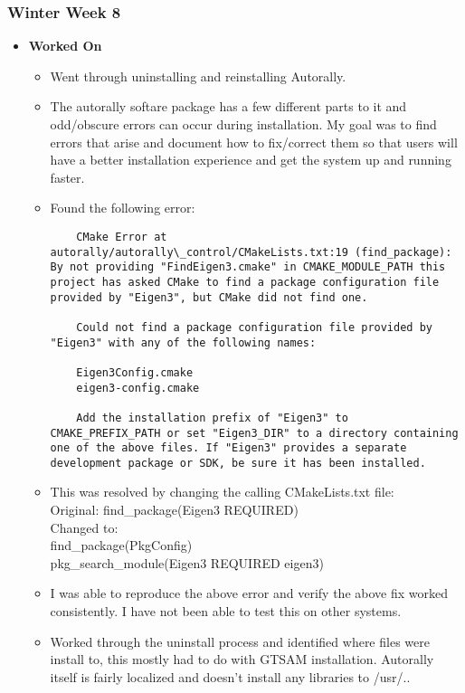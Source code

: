 \documentclass{article}
\begin{document}
\subsubsection{Winter Week 8}
\begin{itemize}
    \item {\textbf{Worked On}}
    \begin{itemize}
        \item Went through uninstalling and reinstalling Autorally.
        \item The autorally softare package has a few different parts to it and odd/obscure errors can occur during installation. My goal was to find errors that arise and document how to fix/correct them so that users will have a better installation experience and get the system up and running faster.

        \item Found the following error:
\begin{verbatim}
    CMake Error at autorally/autorally\_control/CMakeLists.txt:19 (find_package): By not providing "FindEigen3.cmake" in CMAKE_MODULE_PATH this project has asked CMake to find a package configuration file provided by "Eigen3", but CMake did not find one.

    Could not find a package configuration file provided by "Eigen3" with any of the following names:

    Eigen3Config.cmake
    eigen3-config.cmake

    Add the installation prefix of "Eigen3" to CMAKE_PREFIX_PATH or set "Eigen3_DIR" to a directory containing one of the above files. If "Eigen3" provides a separate development package or SDK, be sure it has been installed.
\end{verbatim}

    \item This was resolved by changing the calling CMakeLists.txt file:\\
    Original: find\_package(Eigen3 REQUIRED)\\
    Changed to:\\
    find\_package(PkgConfig)\\
    pkg\_search\_module(Eigen3 REQUIRED eigen3)\\

    \item I was able to reproduce the above error and verify the above fix worked consistently. I have not been able to test this on other systems.

    \item Worked through the uninstall process and identified where files were install to, this mostly had to do with GTSAM installation. Autorally itself is fairly localized and doesn't install any libraries to /usr/..


\end{itemize}
\end{itemize}
\end{document}
